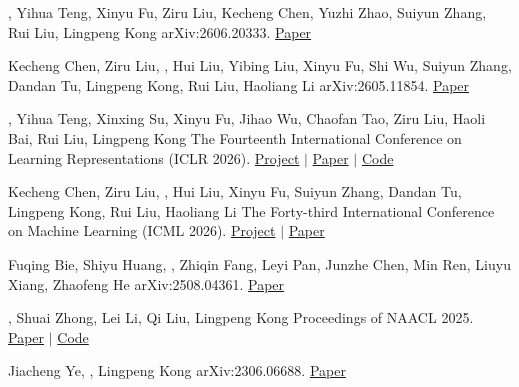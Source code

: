   {\me, Yihua Teng, Xinyu Fu, Ziru Liu, Kecheng Chen, Yuzhi Zhao, Suiyun Zhang, Rui Liu, Lingpeng Kong}
  {arXiv:2606.20333. \href{https://arxiv.org/abs/2606.20333}{Paper}}

  {Kecheng Chen, Ziru Liu, \me, Hui Liu, Yibing Liu, Xinyu Fu, Shi Wu, Suiyun Zhang, Dandan Tu, Lingpeng Kong, Rui Liu, Haoliang Li}
  {arXiv:2605.11854. \href{https://arxiv.org/abs/2605.11854}{Paper}}

  {\me, Yihua Teng, Xinxing Su, Xinyu Fu, Jihao Wu, Chaofan Tao, Ziru Liu, Haoli Bai, Rui Liu, Lingpeng Kong}
  {The Fourteenth International Conference on Learning Representations (ICLR 2026). \href{https://mmsearch-plus.github.io/}{Project} $\vert$ \href{https://arxiv.org/abs/2508.21475}{Paper} $\vert$ \href{https://github.com/mmsearch-plus/MMSearch-Plus}{Code}}

  {Kecheng Chen, Ziru Liu, \me, Hui Liu, Xinyu Fu, Suiyun Zhang, Dandan Tu, Lingpeng Kong, Rui Liu, Haoliang Li}
  {The Forty-third International Conference on Machine Learning (ICML 2026). \href{https://tonyckc.github.io/CCD-DLM-Project/}{Project} $\vert$ \href{https://arxiv.org/abs/2512.02044}{Paper}}

  {Fuqing Bie, Shiyu Huang, \me, Zhiqin Fang, Leyi Pan, Junzhe Chen, Min Ren, Liuyu Xiang, Zhaofeng He}
  {arXiv:2508.04361. \href{https://arxiv.org/abs/2508.04361}{Paper}}

  {\me, Shuai Zhong, Lei Li, Qi Liu, Lingpeng Kong}
  {Proceedings of NAACL 2025. \href{https://aclanthology.org/2025.naacl-long.360/}{Paper} $\vert$ \href{https://github.com/xijia-tao/ImgTrojan}{Code}}

  {Jiacheng Ye, \me, Lingpeng Kong}
  {arXiv:2306.06688. \href{https://arxiv.org/abs/2306.06688}{Paper}}
